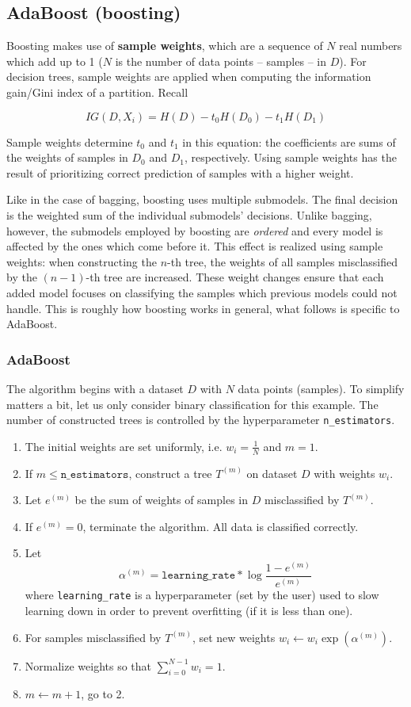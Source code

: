 \documentclass[a4paper]{article}
\begin{document}
	\subsection{AdaBoost (boosting)}
	Boosting makes use of \textbf{sample weights}, which are a sequence of $N$ real numbers which
	add up to 1 ($N$ is the number of data points -- samples -- in $D$). For decision trees,
	sample weights are applied when computing the information gain/Gini index of a partition.
	Recall

	$$IG(D, X_i) = H(D) - t_0H(D_0) - t_1H(D_1)$$

	Sample weights determine $t_0$ and $t_1$ in this equation: the coefficients are
	sums of the weights of samples in $D_0$ and $D_1$, respectively. Using sample
	weights has the result of prioritizing correct prediction of samples with a
	higher weight.

	Like in the case of bagging, boosting uses multiple submodels. The final
	decision is the weighted sum of the individual submodels' decisions. Unlike
	bagging, however, the submodels employed by boosting are \textit{ordered} and
	every model is affected by the ones which come before it. This effect
	is realized using sample weights: when constructing the $n$-th tree,
	the weights of all samples misclassified by the $(n - 1)$-th tree are
	increased. These weight changes ensure that each added model focuses
	on classifying the samples which previous models could not handle. This
	is roughly how boosting works in general, what follows is specific to
	AdaBoost.

	\subsubsection{AdaBoost}
	The algorithm begins with a dataset $D$ with $N$ data points (samples).
	To simplify matters a bit, let us only consider binary classification for
	this example. The number of constructed trees is controlled by the hyperparameter
	\texttt{n\_estimators}.
	\begin{enumerate}
		\item The initial weights are set uniformly, i.e. $w_i = \frac{1}{N}$ and $m = 1$.
		\item If $m \le \mathtt{n\_estimators}$, construct a tree $T^{(m)}$ on dataset $D$
			with weights $w_i$.
		\item Let $e^{(m)}$ be the sum of weights of samples in $D$ misclassified by $T^{(m)}$.
		\item If $e^{(m)} = 0$, terminate the algorithm. All data is classified correctly.
		\item Let
			$$\alpha^{(m)} = \mathtt{learning\_rate} * \log \frac{1 - e^{(m)}}{e^{(m)}}$$
			where \texttt{learning\_rate} is a hyperparameter (set by the user) used
			to slow learning down in order to prevent overfitting (if it is less than one).
		\item For samples misclassified by $T^{(m)}$, set new weights $w_i \leftarrow w_i \exp (\alpha^{(m)})$.
		\item Normalize weights so that $\sum_{i = 0}^{N - 1} w_i = 1$.
		\item $m \leftarrow m + 1$, go to 2.
	\end{enumerate}
\end{document}
